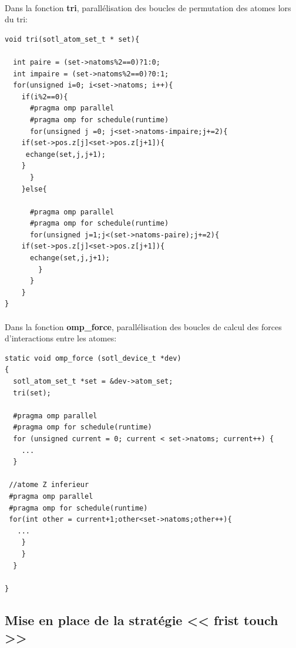 \documentclass[a4paper,11pt]{report}
\begin{document}
\paragraph{}
Dans la fonction \textbf{tri}, parallélisation des boucles de permutation des atomes lors du tri:
\newline
\begin{lstlisting}[style=CStyle]
void tri(sotl_atom_set_t * set){

  int paire = (set->natoms%2==0)?1:0;
  int impaire = (set->natoms%2==0)?0:1;
  for(unsigned i=0; i<set->natoms; i++){
    if(i%2==0){
      #pragma omp parallel
      #pragma omp for schedule(runtime)
      for(unsigned j =0; j<set->natoms-impaire;j+=2){
	if(set->pos.z[j]<set->pos.z[j+1]){
	 echange(set,j,j+1);
	}
      }
    }else{

      #pragma omp parallel
      #pragma omp for schedule(runtime)
      for(unsigned j=1;j<(set->natoms-paire);j+=2){
	if(set->pos.z[j]<set->pos.z[j+1]){
	  echange(set,j,j+1);
        }
      }
    }
}
\end{lstlisting}

\paragraph{}
Dans la fonction \textbf{omp\_force}, parallélisation des boucles de calcul des forces d'interactions entre les atomes:
\newline
\begin{lstlisting}[style=CStyle]
static void omp_force (sotl_device_t *dev)
{
  sotl_atom_set_t *set = &dev->atom_set;
  tri(set);
  
  #pragma omp parallel
  #pragma omp for schedule(runtime)
  for (unsigned current = 0; current < set->natoms; current++) {
    ...
  }

 //atome Z inferieur
 #pragma omp parallel
 #pragma omp for schedule(runtime)
 for(int other = current+1;other<set->natoms;other++){
   ...
	}
    }
  }

}
\end{lstlisting}

\subsection{Mise en place de la stratégie \textbf{<< frist touch >>}}
\end{document}
